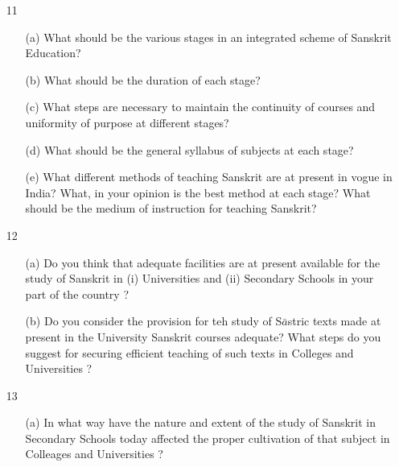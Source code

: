 {\rm 
\begin{itemize}
\item[11] \begin{itemize}
           \item[(a)] What should be the various stages in an integrated scheme of Sanskrit Education?
           
           \item[(b)] What should be the duration of each stage?
           
           \item[(c)] What steps are necessary to maintain the continuity of courses and uniformity of purpose at different stages?
           
           \item[(d)] What should be the general syllabus of subjects at each stage?
           
           \item[(e)] What different methods of teaching Sanskrit are at present in vogue in India? What, in your opinion is the best method at each stage? What should be the medium of instruction for teaching  Sanskrit?
          \end{itemize}
   
   
   \item[12] \begin{itemize}
              
              \item[(a)] Do you think that adequate facilities are at present available for the study of Sanskrit in (i) Universities and (ii) Secondary Schools in your part of the country ?
              
              \item[(b)] Do you consider the provision for teh study of S$\bar{a}$stric texts made at present in the University Sanskrit courses adequate? What steps do you suggest for securing efficient teaching of such texts in Colleges and Universities ?
              \end{itemize}
              
    \item[13] \begin{itemize}
    
               \item[(a)] In what way have the nature and extent of the study of Sanskrit in Secondary Schools today affected the proper cultivation of that subject in Colleages and Universities ?
               

\end{itemize}
\end{itemize}}
